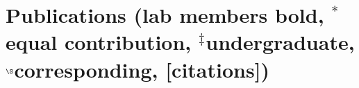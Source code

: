 \documentclass[letterpaper,10pt]{article}
\renewenvironment{itemize}{
  \begin{list}{}{
    \setlength{\leftmargin}{1.5em}
  }
}{
  \end{list}
}
\begin{document}
\begin{itemize}

\end{itemize}

\section*{Publications {\small(lab members bold, $^*$equal contribution, $^\ddagger$undergraduate, $^\S$corresponding, [citations])}}

\end{document}
